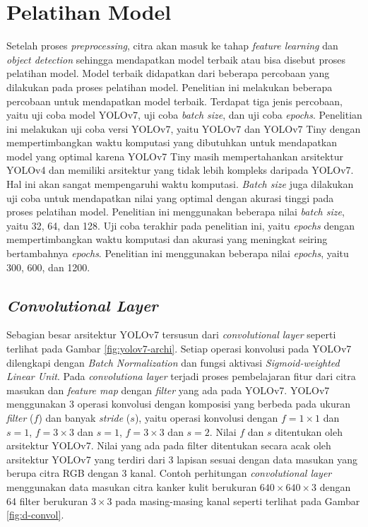 \section{Pelatihan Model}
Setelah proses \textit{preprocessing}, citra akan masuk ke tahap \textit{feature learning} dan \textit{object detection} sehingga mendapatkan model terbaik atau bisa disebut proses pelatihan model. Model terbaik didapatkan dari beberapa percobaan yang dilakukan pada proses pelatihan model. Penelitian ini melakukan beberapa percobaan untuk mendapatkan model terbaik. Terdapat tiga jenis percobaan, yaitu uji coba model YOLOv7, uji coba \textit{batch size}, dan uji coba \textit{epochs}. Penelitian ini melakukan uji coba versi YOLOv7, yaitu YOLOv7 dan YOLOv7 Tiny dengan mempertimbangkan waktu komputasi yang dibutuhkan untuk mendapatkan model yang optimal karena YOLOv7 Tiny masih mempertahankan arsitektur YOLOv4 dan memiliki arsitektur yang tidak lebih kompleks daripada YOLOv7. Hal ini akan sangat mempengaruhi waktu komputasi. \textit{Batch size} juga dilakukan uji coba untuk mendapatkan nilai yang optimal dengan akurasi tinggi pada proses pelatihan model. Penelitian ini menggunakan beberapa nilai \textit{batch size}, yaitu 32, 64, dan 128. Uji coba terakhir pada penelitian ini, yaitu \textit{epochs} dengan mempertimbangkan waktu komputasi dan akurasi yang meningkat seiring bertambahnya \textit{epochs}. Penelitian ini menggunakan beberapa nilai \textit{epochs}, yaitu 300, 600, dan 1200.
    \subsection{\textit{Convolutional Layer}}
    Sebagian besar arsitektur YOLOv7 tersusun dari \textit{convolutional layer} seperti terlihat pada Gambar \ref{fig:yolov7-archi}. Setiap operasi konvolusi pada YOLOv7 dilengkapi dengan \textit{Batch Normalization} dan fungsi aktivasi \textit{Sigmoid-weighted Linear Unit}. Pada \textit{convolutiona layer} terjadi proses pembelajaran fitur dari citra masukan dan \textit{feature map} dengan \textit{filter} yang ada pada YOLOv7. YOLOv7 menggunakan 3 operasi konvolusi dengan komposisi yang berbeda pada ukuran \textit{filter} ($f$) dan banyak \textit{stride} ($s$), yaitu operasi konvolusi dengan $f=1\times 1$ dan $s=1$, $f=3\times 3$ dan $s=1$, $f=3\times 3$ dan $s=2$. Nilai $f$ dan $s$ ditentukan oleh arsitektur YOLOv7. Nilai yang ada pada filter ditentukan secara acak oleh arsitektur YOLOv7 yang terdiri dari 3 lapisan sesuai dengan data masukan yang berupa citra RGB dengan 3 kanal. Contoh perhitungan \textit{convolutional layer} menggunakan data masukan citra kanker kulit berukuran $640\times 640\times 3$ dengan 64 filter berukuran $3\times 3$ pada masing-masing kanal seperti terlihat pada Gambar \ref{fig:d-convol}.

